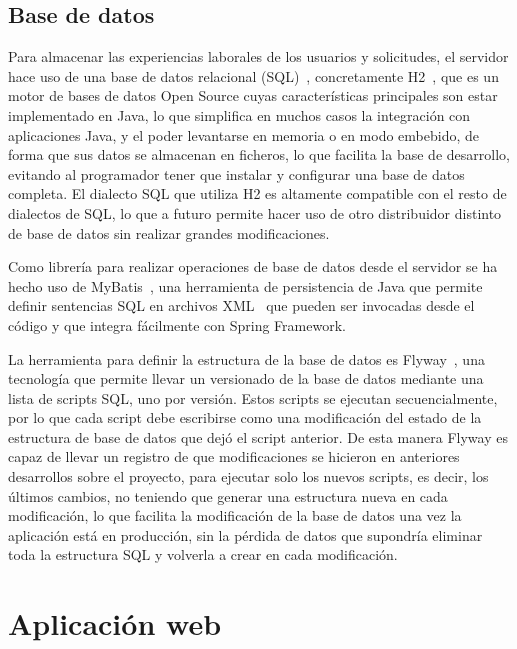 \documentclass[a4paper, 12pt]{book}
\begin{document}
    \subsection{Base de datos}
    \label{subsec:intro_applicationserver_database}

    Para almacenar las experiencias laborales de los usuarios y solicitudes, el servidor hace uso de una base de datos relacional (SQL)~\cite{bib:sql}, concretamente H2~\cite{bib:h2}, que es un motor de bases de datos Open Source cuyas características principales son estar implementado en Java,
    lo que simplifica en muchos casos la integración con aplicaciones Java, y el poder levantarse en memoria o en modo embebido, de forma que sus datos se almacenan en ficheros, lo que facilita la base de desarrollo, evitando al programador tener que instalar y configurar una base de datos completa.
    El dialecto SQL que utiliza H2 es altamente compatible con el resto de dialectos de SQL, lo que a futuro permite hacer uso de otro distribuidor distinto de base de datos sin realizar grandes modificaciones.

    Como librería para realizar operaciones de base de datos desde el servidor se ha hecho uso de MyBatis~\cite{bib:mybatis}, una herramienta de persistencia de Java que permite definir sentencias SQL en archivos XML~\cite{bib:xml} que pueden ser invocadas desde el código y que integra fácilmente con Spring Framework.

    La herramienta para definir la estructura de la base de datos es Flyway~\cite{bib:flyway}, una tecnología que permite llevar un versionado de la base de datos mediante una lista de scripts SQL, uno por versión. Estos scripts se ejecutan secuencialmente, por lo que cada script debe escribirse como una modificación del estado de la estructura de base de datos que dejó el script anterior.
    De esta manera Flyway es capaz de llevar un registro de que modificaciones se hicieron en anteriores desarrollos sobre el proyecto, para ejecutar solo los nuevos scripts, es decir, los últimos cambios, no teniendo que generar una estructura nueva en cada modificación, lo que facilita la modificación de la base de datos una vez la aplicación está en producción,
    sin la pérdida de datos que supondría eliminar toda la estructura SQL y volverla a crear en cada modificación.


    \section{Aplicación web}
    \label{sec:intro_webapplication}
\end{document}
